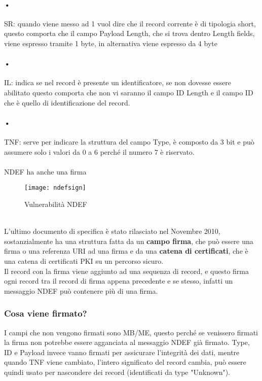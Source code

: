 \paragraph{•}SR: quando viene messo ad 1 vuol dire che il record corrente è di tipologia short, questo comporta che il campo Payload Length, che si trova dentro Length fields, viene espresso tramite 1 byte, in alternativa viene espresso da 4 byte
\paragraph{•} IL: indica se nel record è presente un identificatore, se non dovesse essere abilitato questo comporta che non vi saranno il campo ID Length e il campo ID che è quello di identificazione del record.
\paragraph{•}TNF: serve per indicare la struttura del campo Type, è composto da 3 bit e può assumere solo i valori da 0 a 6 perché il numero 7 è riservato.
\\\\NDEF ha anche una firma
\begin{figure}[h]
\begin{center}
\texttt{[image: ndefsign]}
\caption[NDEF Vulnerabilità]{Vulnerabilità NDEF\footnotemark}
\end{center}
\end{figure}
\\L'ultimo documento di specifica è stato rilasciato nel Novembre 2010, sostanzialmente ha una struttura fatta da un \textbf{campo firma}, che può essere una firma o una referenza URI ad una firma e da una \textbf{catena di certificati}, che è una catena di certificati PKI su un percorso sicuro.
\\Il record con la firma viene aggiunto ad una sequenza di record, e questo firma ogni record tra il record di firma appena precedente e se stesso, infatti un messaggio NDEF può contenere più di una firma.
\subsubsection{Cosa viene firmato?}
\hspace{\parindent} I campi che non vengono firmati sono MB/ME, questo perché se venissero firmati la firma non potrebbe essere agganciata al messaggio NDEF già firmato. Type, ID e Payload invece vanno firmati per assicurare l'integrità dei dati, mentre quando TNF viene cambiato, l'intero significato del record cambia, può essere quindi usato per nascondere dei record (identificati da type "Unknown"). 
